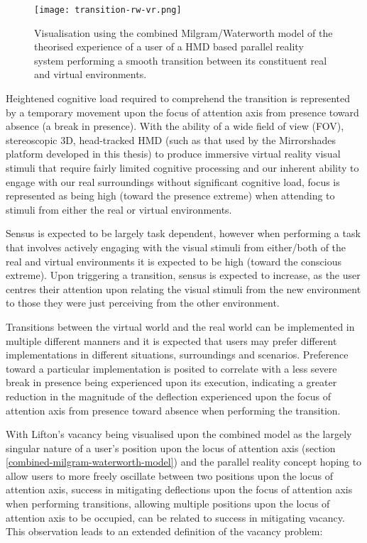 \begin{figure}[h]
	\begin{center}
		\texttt{[image: transition-rw-vr.png]}
		\caption{Visualisation using the combined Milgram/Waterworth model of the theorised experience of a user of a HMD based parallel reality system performing a smooth transition between its constituent real and virtual environments.}
		\label{focus-locus-sensus-with-virtuality-continuum-with-transition}
	\end{center}	
\end{figure}

Heightened cognitive load required to comprehend the transition is represented by a temporary movement upon the focus of attention axis from presence toward absence (a break in presence). With the ability of a wide field of view (FOV), stereoscopic 3D, head-tracked HMD (such as that used by the Mirrorshades platform developed in this thesis) to produce immersive virtual reality visual stimuli that require fairly limited cognitive processing and our inherent ability to engage with our real surroundings without significant cognitive load, focus is represented as being high (toward the presence extreme) when attending to stimuli from either the real or virtual environments.

Sensus is expected to be largely task dependent, however when performing a task that involves actively engaging with the visual stimuli from either/both of the real and virtual environments it is expected to be high (toward the conscious extreme). Upon triggering a transition, sensus is expected to increase, as the user centres their attention upon relating the visual stimuli from the new environment to those they were just perceiving from the other environment.

Transitions between the virtual world and the real world can be implemented in multiple different manners and it is expected that users may prefer different implementations in different situations, surroundings and scenarios. Preference toward a particular implementation is posited to correlate with a less severe break in presence being experienced upon its execution, indicating a greater reduction in the magnitude of the deflection experienced upon the focus of attention axis from presence toward absence when performing the transition.

With Lifton's vacancy being visualised upon the combined model as the largely singular nature of a user's position upon the locus of attention axis (section \ref{combined-milgram-waterworth-model}) and the parallel reality concept hoping to allow users to more freely oscillate between two positions upon the locus of attention axis, success in mitigating deflections upon the focus of attention axis when performing transitions, allowing multiple positions upon the locus of attention axis to be occupied, can be related to success in mitigating vacancy. This observation leads to an extended definition of the vacancy problem:

